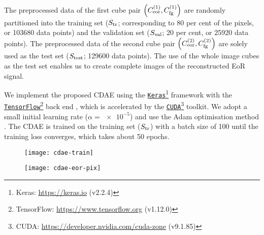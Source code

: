 The preprocessed data of the first cube pair
$\left( C_{\mathrm{eor}}^{(1)}, C_{\mathrm{fg}}^{(1)} \right)$
are randomly partitioned into the training set ($S_{\mathrm{tr}}$; corresponding
to 80 per cent of the pixels, or \num{103680} data points) and the
validation set ($S_{\mathrm{val}}$; 20 per cent, or \num{25920} data points).
The preprocessed data of the second cube pair
$\left( C_{\mathrm{eor}}^{(2)}, C_{\mathrm{fg}}^{(2)} \right)$
are solely used as the test set ($S_{\mathrm{test}}$; \num{129600} data points).
The use of the whole image cubes as the test set enables us to create
complete images of the reconstructed EoR signal.

We implement the proposed CDAE using the
\href{https://keras.io}{\texttt{Keras}}\footnote{%
  Keras: \url{https://keras.io} (v2.2.4)}
framework \cite{keras} with the
\href{https://www.tensorflow.org}{\texttt{TensorFlow}}\footnote{%
  TensorFlow: \url{https://www.tensorflow.org} (v1.12.0)}
back end \cite{tensorflow},
which is accelerated by the
\href{https://developer.nvidia.com/cuda-zone}{\texttt{CUDA}}\footnote{%
  CUDA: \url{https://developer.nvidia.com/cuda-zone} (v9.1.85)}
toolkit.
We adopt a small initial learning rate ($\alpha = \num{e-5}$) and use the
Adam optimisation method \cite{kingma2015}.
The CDAE is trained on the training set ($S_{\mathrm{tr}}$) with a batch size of
100 until the training loss converges, which takes about 50 epochs.

\begin{figure}[htp]
  \centering
  \texttt{[image: cdae-train]}
  \label{fig:cdae-train}
\end{figure}

\begin{figure}[htp]
  \centering
  \texttt{[image: cdae-eor-pix]}
  \label{fig:cdae-eor-pix}
\end{figure}

